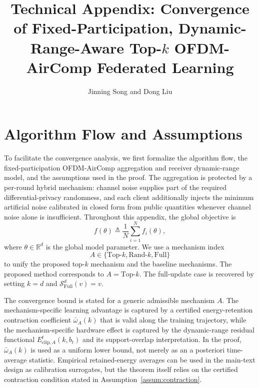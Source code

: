 \documentclass[journal]{IEEEtran}
\begin{document}
\color{revisionred}

\title{Technical Appendix: Convergence of Fixed-Participation, Dynamic-Range-Aware Top-$k$ OFDM-AirComp Federated Learning}
\author{Jinning Song and Dong Liu}
\maketitle

\section{Algorithm Flow and Assumptions}

To facilitate the convergence analysis, we first formalize the algorithm flow, the fixed-participation OFDM-AirComp aggregation and receiver dynamic-range model, and the assumptions used in the proof. The aggregation is protected by a per-round hybrid mechanism: channel noise supplies part of the required differential-privacy randomness, and each client additionally injects the minimum artificial noise calibrated in closed form from public quantities whenever channel noise alone is insufficient. Throughout this appendix, the global objective is
\begin{equation}
    f(\theta) \triangleq \frac{1}{N}\sum_{i=1}^{N} f_i(\theta),
\end{equation}
where $\theta\in\mathbb{R}^d$ is the global model parameter. We use a mechanism index
\begin{equation}
    A\in\{\mathrm{Top}\text{-}k,\mathrm{Rand}\text{-}k,\mathrm{Full}\}
\end{equation}
to unify the proposed top-$k$ mechanism and the baseline mechanisms. The proposed method corresponds to $A=\mathrm{Top}\text{-}k$. The full-update case is recovered by setting $k=d$ and $\mathcal{S}_{\mathrm{Full}}^d(v)=v$.

The convergence bound is stated for a generic admissible mechanism $A$. The mechanism-specific learning advantage is captured by a certified energy-retention contraction coefficient $\bar{\omega}_A(k)$ that is valid along the training trajectory, while the mechanism-specific hardware effect is captured by the dynamic-range residual functional $E_{\mathrm{clip},A}^t(k,b_t)$ and its support-overlap interpretation. In the proof, $\bar{\omega}_A(k)$ is used as a uniform lower bound, not merely as an a posteriori time-average statistic. Empirical retained-energy averages can be used in the main-text design as calibration surrogates, but the theorem itself relies on the certified contraction condition stated in Assumption~\ref{assum:contraction}.
\end{document}
